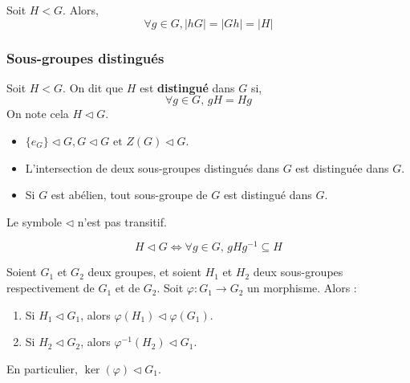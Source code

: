 	\begin{proposition}
		Soit $H < G$. Alors,
		\[ \forall g \in G, \vert hG \vert = \vert Gh \vert = \vert H \vert \]
	\end{proposition}

	\subsubsection{Sous-groupes distingués}


	\begin{definition}
		Soit $H < G$. On dit que $H$ est \textbf{distingué} dans $G$ si,
		\[ \forall g \in G, \, gH = Hg \]
		On note cela $H \lhd G$.
	\end{definition}

	\begin{example}
		\begin{itemize}
			\item $\{ e_G \} \lhd G, G \lhd G \text{ et } Z(G) \lhd G$.
			\item L'intersection de deux sous-groupes distingués dans $G$ est distinguée dans $G$.
			\item Si $G$ est abélien, tout sous-groupe de $G$ est distingué dans $G$.
		\end{itemize}
	\end{example}


	\begin{remark}
		Le symbole $\lhd$ n'est pas transitif.
	\end{remark}

	\begin{proposition}
		\[ H \lhd G \iff \forall g \in G, \, gHg^{-1} \subseteq H \]
	\end{proposition}


	\begin{proposition}
		Soient $G_1$ et $G_2$ deux groupes, et soient $H_1$ et $H_2$ deux sous-groupes respectivement de $G_1$ et de $G_2$. Soit $\varphi : G_1 \rightarrow G_2$ un morphisme. Alors :
		\begin{enumerate}[label=(\roman*)]
			\item Si $H_1 \lhd G_1$, alors $\varphi(H_1) \lhd \varphi(G_1)$.
			\item Si $H_2 \lhd G_2$, alors $\varphi^{-1}(H_2) \lhd G_1$.
		\end{enumerate}
		En particulier, $\ker(\varphi) \lhd G_1$.
	\end{proposition}

